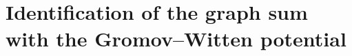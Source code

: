 \newcommand{\ideKt}{\widetilde{\bbK}_{\mathrm{CY}}}      %
\newcommand{\ideFz}{\bbF_{\circ}}                        %
\newcommand{\ideone}{\mathbf{1}}                         %
\newcommand{\ideV}{\mathcal{V}}                          %
\newcommand{\idePF}{\mathsf{PF}}                         %
\newcommand{\idekm}{\mathsf{k}_{\mathrm{m}}}             %
\newcommand{\ideCh}{\mathcal{X}}                         %
\newcommand{\ideCurve}{\mathfrak{C}}                     %
\newcommand{\idesec}{\varsigma}                          %
\newcommand{\ideLam}{\boldsymbol{\Lambda}}               %
\newcommand{\idecan}{\boldsymbol{u}}                     %
\newcommand{\ideS}{\mathscr{S}}                          %
\newcommand{\idelg}[1]{\mathrm{a}^{#1}}                  %
\newcommand{\ideP}{\mathfrak{P}}                         %
\newcommand{\ideN}{\mathfrak{N}}                         %
\newcommand{\ideG}{\mathfrak{G}}                         %
\newcommand{\ideW}{\mathsf{W}_{\Psi}}                    %
\newcommand{\ideRf}{\mathsf{R}^{\mathrm{f}}}             %
\newcommand{\ideY}{\mathsf{Y}}                           %
\newcommand{\ideZ}{\mathsf{Z}}                           %
\newcommand{\idesp}{\mathfrak{s}}                        %
\newcommand{\ideQU}{\mathrm{V}}                          %
\newcommand{\ideT}{\mathsf{T}_{\!\Rm}}                   %

\section{Identification of the graph sum with the Gromov--Witten potential}
\label{sec:ide}

